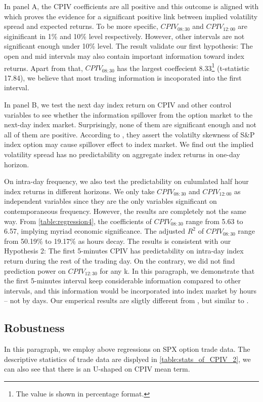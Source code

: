 In panel A, the CPIV coefficients are all positive and this outcome is aligned with \textcite{cremers2010deviations} which proves the evidence for a significant positive link between implied volatility spread and expected returns. To be more specific, $CPIV_{08:30}$ and $CPIV_{12:00}$ are siginificant in 1\% and 10\% level respectively. However, other intervals are not significant enough under 10\% level. The result validate our first hypothesis: The open and mid intervals may also contain important information toward index returns. Apart from that, $CPIV_{08:30}$ has the largest coeffecient 8.33\footnote{The value is shown in percentage format.} (t-statistic 17.84), we believe that most trading information is incoporated into the first interval.

In panel B, we test the next day index return on CPIV and other control variables to see whether the information spillover from the option market to the next-day index market. Surprisingly, none of them are significant enough and not all of them are positive. According to \textcite{atilgan2015implied}, they assert the volatilty skewness of S\&P index option may cause spillover effect to index market. We find out the implied volatility spread has no predictability on aggregate index returns in one-day horizon.

On intra-day frequency, we also test the predictability on culumlated half hour index returns in different horizons. We only take $CPIV_{08:30}$ and $CPIV_{12:00}$ as independent variables since they are the only variables significant on contemporaneous frequency. However, the results are completely not the same way. From \autoref{table:regression4}, the coefficients of $CPIV_{08:30}$ range from 5.63 to 6.57, implying myriad economic significance. The adjusted $R^{2}$ of $CPIV_{08:30}$ range from 50.19\% to 19.17\% as hours decay. The results is consistent with our Hypothesis 2: The first 5-minutes CPIV has predictability on intra-day index return during the rest of the trading day. On the contrary, we did not find prediction power on $CPIV_{12:30}$ for any k. In this paragraph, we demonstrate that the first 5-minutes interval keep considerable information compared to other intervals, and this information would be incorporated into index market by hours -- not by days. Our emperical results are sligtly different from \textcite{cremers2010deviations}, but similar to \textcite{kumar1992behavior}. 
   
\subsection{Robustness}
In this paragraph, we employ above regressions on SPX option trade data. The descriptive statistics of trade data are displyed in \autoref{table:stats_of_CPIV_2}, we can also see that there is an U-shaped on CPIV mean term.   
   



